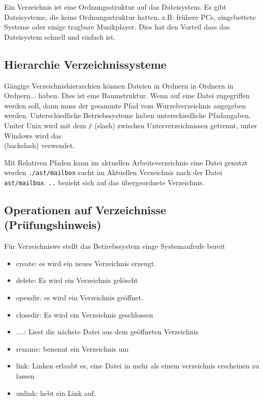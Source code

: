 Ein Verzeichnis ist eine Ordnungsstruktur auf das Dateisystem. Es gibt Dateisysteme, die keine Ordnungsstruktur hatten, z.B: frühere PCs, eingebettete Systeme oder einige tragbare Musikplayer. Dies hat den Vorteil dass das Dateisystem schnell und einfach ist.

\subsection{Hierarchie Verzeichnissysteme}

Gängige Verzeichnishierarchien können Dateien in Ordnern in Ordnern in Ordnern... haben. Dies ist eine Baumstruktur. Wenn auf eine Datei zugegriffen werden soll, dann muss der gesammte Pfad vom Wurzelverzeichnis angegeben werden. Unterschiedliche Betriebssysteme haben unterschiedliche Pfadangaben. Uniter Unix wird mit dem \texttt{/} (slash) zwischen Unterverzeichnissen getrennt, unter Windows wird das \texttt{\\} (backslash) verwendet.

Mit Relativen Pfaden kann im aktuellen Arbeitsverzeichnis eine Datei genutzt werden \texttt{./ast/mailbox} sucht im Aktuellen Verzeichnis nach der Datei \texttt{ast/mailbox}. \texttt{..} bezieht sich auf das übergeordnete Verzeichnis.

\subsection{Operationen auf Verzeichnisse (Prüfungshinweis)}

Für Verzeichniswe stellt das Betirebssystem einge Systemaufrufe bereit

\begin{itemize}
    \item create: es wird ein neues Verzeichnis erzeugt.
    \item delete: Es wird ein Verzeichnis gelöscht
    \item opendir: es wird ein Verzeichnis geöffnet.
    \item closedir: Es wird ein Verzeichnis geschlossen
    \item ....: Liest die nächste Datei aus dem geöffneten Verzeichnis
    \item rename: benennt ein Verzeichnis um
    \item link: Linken erlaubt es, eine Datei in mehr als einem verzeichnis erscheinen zu lassen
    \item unlink: hebt ein Link auf.
\end{itemize}

